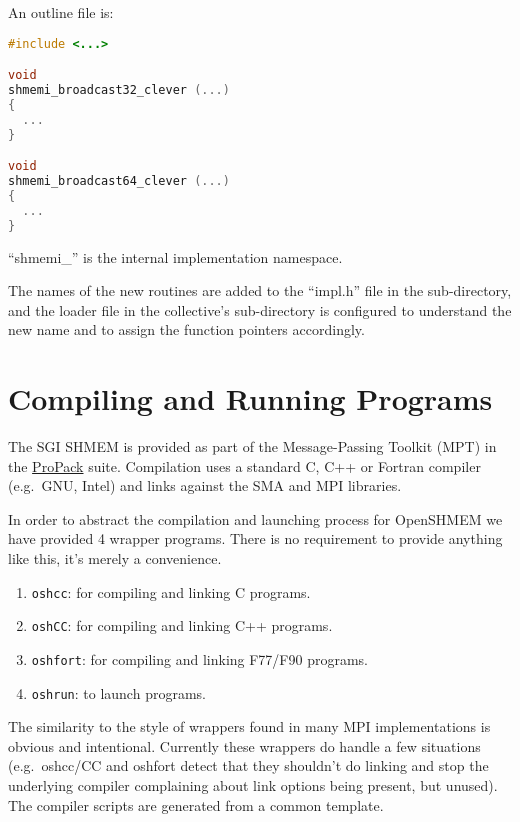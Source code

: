 \documentclass[english]{article}
\begin{document}
\noindent
An outline file is:

\vspace{0.1in}
\begin{minipage}{0.75\linewidth}
\begin{lstlisting}[language=C,caption={Outline of broadcast implementation}]
#include <...>

void
shmemi_broadcast32_clever (...)
{
  ...
}

void
shmemi_broadcast64_clever (...)
{
  ...
}
\end{lstlisting}
\end{minipage}
\vspace{0.1in}

``shmemi\_'' is the internal implementation namespace.

The names of the new routines are added to the ``impl.h'' file in the
sub-directory, and the loader file in the collective's sub-directory
is configured to understand the new name and to assign the function
pointers accordingly.

\section{Compiling and Running Programs}

The SGI SHMEM is provided as part of the Message-Passing Toolkit (MPT)
in the
\href{http://www.sgi.com/products/software/propack.html}{ProPack}
suite. Compilation uses a standard C, C++ or Fortran compiler
(e.g.\ GNU, Intel) and links against the SMA and MPI libraries.

In order to abstract the compilation and launching process for
OpenSHMEM we have provided 4 wrapper programs.  There is no
requirement to provide anything like this, it's merely a convenience.

\begin{enumerate}
\item \texttt{oshcc}: for compiling and linking C programs.
\item \texttt{oshCC}: for compiling and linking C++ programs.
\item \texttt{oshfort}: for compiling and linking F77/F90 programs.
\item \texttt{oshrun}: to launch programs.
\end{enumerate}

The similarity to the style of wrappers found in many MPI
implementations is obvious and intentional. Currently these wrappers
do handle a few situations (e.g.\ oshcc/CC and oshfort detect that they
shouldn't do linking and stop the underlying compiler complaining
about link options being present, but unused). The compiler scripts
are generated from a common template.
\end{document}
